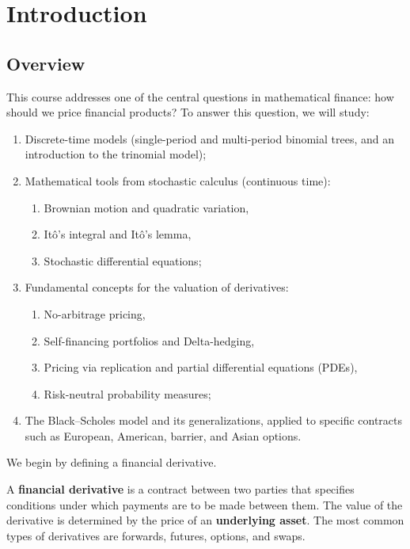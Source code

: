 \chapter{Introduction}
\label{ch:introduction}

\section{Overview}
This course addresses one of the central questions in mathematical finance: how should we price financial products? To answer this question, we will study:
\begin{enumerate}
    \item Discrete-time models (single-period and multi-period binomial trees, and an introduction to the trinomial model);
    \item Mathematical tools from stochastic calculus (continuous time):
    \begin{enumerate}
        \item Brownian motion and quadratic variation,
        \item It\^o's integral and It\^o's lemma,
        \item Stochastic differential equations;
    \end{enumerate}
    \item Fundamental concepts for the valuation of derivatives:
    \begin{enumerate}
        \item No-arbitrage pricing,
        \item Self-financing portfolios and Delta-hedging,
        \item Pricing via replication and partial differential equations (PDEs),
        \item Risk-neutral probability measures;
    \end{enumerate}
    \item The Black--Scholes model and its generalizations, applied to specific contracts such as European, American, barrier, and Asian options.
\end{enumerate}

We begin by defining a financial derivative.

\begin{definition}
\label{def:derivative}
A \textbf{financial derivative} is a contract between two parties that specifies conditions under which payments are to be made between them. The value of the derivative is determined by the price of an \textbf{underlying asset}. The most common types of derivatives are forwards, futures, options, and swaps.
\end{definition}

